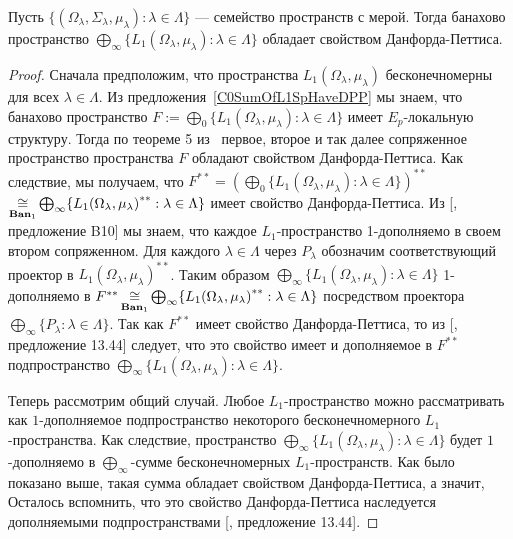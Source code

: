 \begin{proposition}\label{ProdOfL1SpHaveDPP} Пусть $
\{(\Omega_\lambda,\Sigma_\lambda,\mu_\lambda):\lambda\in\Lambda \}$ ---
семейство пространств с мерой. Тогда банахово пространство $\bigoplus_\infty
\{L_1(\Omega_\lambda,\mu_\lambda):\lambda\in\Lambda \}$ обладает свойством
Данфорда-Петтиса.
\end{proposition}
\begin{proof} Сначала предположим, что пространства $L_1(\Omega_\lambda,
\mu_\lambda)$ бесконечномерны для всех $\lambda\in\Lambda$. Из
предложения~\ref{C0SumOfL1SpHaveDPP} мы знаем, что банахово пространство
$F:=\bigoplus_0 \{L_1(\Omega_\lambda,\mu_\lambda):\lambda\in\Lambda \}$ имеет
$E_{p}$-локальную структуру. Тогда по теореме 5 из~\cite{BourgOnTheDPP} первое,
второе и так далее сопряженное пространство пространства $F$ обладают свойством
Данфорда-Петтиса. Как следствие, мы получаем, что 
$F^{**}={\left(
    \bigoplus_0 \{L_1(\Omega_\lambda,\mu_\lambda):\lambda\in\Lambda \}
\right)}^{**}$
$\mathop{\mathbin{\cong}}\limits_{\mathbf{Ban}_1}
\bigoplus_\infty \{{L_1(\Omega_\lambda,\mu_\lambda)}^{**}:\lambda\in\Lambda \}$ 
имеет свойство Данфорда-Петтиса. 
Из [\cite{DefFloTensNorOpId}, предложение B10] мы знаем, что
каждое $L_1$-пространство 1-дополняемо в своем втором сопряженном. Для каждого
$\lambda\in\Lambda$ через $P_\lambda$ обозначим соответствующий проектор в
${L_1(\Omega_\lambda,\mu_\lambda)}^{**}$. Таким образом $\bigoplus_\infty
\{L_1(\Omega_\lambda,\mu_\lambda):\lambda\in\Lambda \}$ 1-дополняемо в
$F^{**}
\mathop{\mathbin{\cong}}\limits_{\mathbf{Ban}_1}
\bigoplus_\infty \{{L_1(\Omega_\lambda,\mu_\lambda)}^{**}:\lambda\in\Lambda \}$ 
посредством проектора 
$\bigoplus_\infty  \{P_\lambda:\lambda\in\Lambda \}$. Так как $F^{**}$
имеет свойство Данфорда-Петтиса, то из [\cite{FabHabBanSpTh}, предложение 13.44]
следует, что это свойство имеет и дополняемое в $F^{**}$ подпространство
$\bigoplus_\infty \{L_1(\Omega_\lambda,\mu_\lambda):\lambda\in\Lambda \}$.

Теперь рассмотрим общий случай. Любое $L_1$-пространство можно рассматривать как
$1$-дополняемое подпространство некоторого бесконечномерного $L_1$-пространства.
Как следствие, пространство $\bigoplus_\infty
\{L_1(\Omega_\lambda,\mu_\lambda):\lambda\in\Lambda \}$ будет $1$-дополняемо в
$\bigoplus_\infty$-сумме бесконечномерных $L_1$-пространств. Как было показано
выше, такая сумма обладает свойством Данфорда-Петтиса, а значит,  Осталось
вспомнить, что это свойство Данфорда-Петтиса наследуется дополняемыми
подпространствами [\cite{FabHabBanSpTh}, предложение 13.44].
\end{proof}

